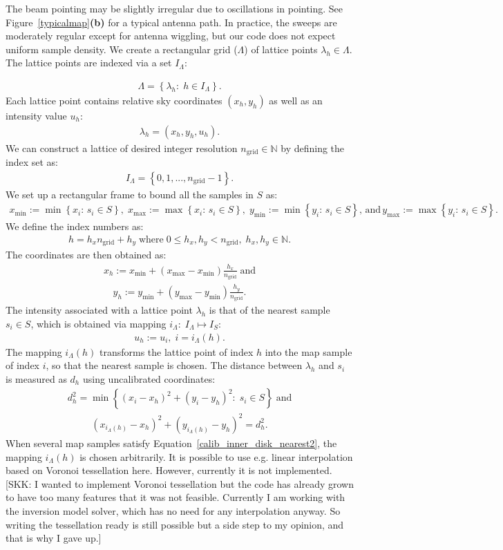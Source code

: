 \documentclass{aa}
\newcommand{\skk}[1]{\textcolor{midorange}{[SKK: #1]}} %
\newcommand{\eqnl}[2]{\begin{eqnarray}\label{#1}#2\end{eqnarray}}
\renewcommand{\min}[1]{\operatorname{min} \left\{ #1 \right\}}
\renewcommand{\max}[1]{\operatorname{max} \left\{ #1 \right\}}
\newcommand{\s}[2]{{#1}_{\mathrm{#2}}}
\begin{document}
  The beam pointing may be slightly 
  irregular due to oscillations in pointing. See Figure~\ref{typicalmap}{\bf(b)} for a typical antenna path. In 
  practice, the sweeps are moderately regular except for antenna wiggling, but our code does not expect uniform sample 
  density. We create a rectangular grid ($\Lambda$) of lattice points $\lambda_h \in \Lambda$. The lattice points are indexed via a set $I_{\Lambda}$:
  
  \eqnl{calib_inner_disk_lattice}{
  \Lambda = \left\{ \lambda_h :\; h \in I_{\Lambda} \right\} \text{.}
  }
  Each lattice point contains relative sky coordinates $\left( x_h, y_h \right)$ as well as an intensity value $u_h$:
  \eqnl{calib_inner_disk_point}{
  \lambda_h = \left( x_h, y_h, u_h \right) \text{.}
  }
  We can construct a lattice of desired integer resolution $\s{n}{grid} \in \mathds{N}$ by defining the index set as:
  \eqnl{calib_inner_disk_index}{
  I_{\Lambda} = \left\{ 0, 1, ..., \s{n}{grid}-1 \right\} \text{.}
  }
  We set up a rectangular frame to bound all the samples in $S$ as:
  \eqnl{calib_inner_disk_frame}{
  \s{x}{min} := \min{x_i:\, s_i \in S}, \; \s{x}{max} := \max{x_i:\, s_i \in S}, \; \s{y}{min} := \min{y_i:\, s_i \in S} \text{, and} \, \s{y}{max} := \max{y_i:\, s_i \in S} \text{.}
  }
  We define the index numbers as:
  \eqnl{calib_inner_disk_elem}{
  h = h_x \s{n}{grid} + h_y \; \text{where} \; 0 \le h_x,h_y < \s{n}{grid}, \; h_x,h_y \in \mathds{N} \text{.}
  }
  The coordinates are then obtained as:
  \eqnl{calib_inner_disk_lattice_x}{
  x_h := \s{x}{min} + \left( \s{x}{max} - \s{x}{min} \right) \frac{h_x}{\s{n}{grid}} \; \text{and}
  }
  \eqnl{calib_inner_disk_lattice_y}{
  y_h := \s{y}{min} + \left( \s{y}{max} - \s{y}{min} \right) \frac{h_y}{\s{n}{grid}} \text{.}
  }
  The intensity associated with a lattice point $\lambda_h$ is that of the nearest sample $s_i \in S$, which is obtained via mapping $i_{\Lambda}:\; I_{\Lambda} \mapsto I_S$:
  \eqnl{calib_inner_disk_lattice_u}{
  u_h := u_i, \; i = i_{\Lambda}(h) \text{.}
  }
  The mapping $i_{\Lambda}(h)$ transforms the lattice point of index $h$ into the map sample of index $i$, so that the nearest sample is chosen. The distance between $\lambda_h$ and $s_i$ is measured as $d_h$ using uncalibrated coordinates:
  \eqnl{calib_inner_disk_nearest1}{
  d_h^2 = \min{\left( x_i - x_h \right)^2 + \left( y_i - y_h \right)^2:\; s_i \in S} \; \text{and}
  }
  \eqnl{calib_inner_disk_nearest2}{
  \left( x_{i_{\Lambda}(h)} - x_h \right)^2 + \left( y_{i_{\Lambda}(h)} - y_h \right)^2 = d_h^2 \text{.}
  }
   When several map samples satisfy Equation~\ref{calib_inner_disk_nearest2}, the mapping $i_{\Lambda}(h)$ is chosen 
  arbitrarily. It is possible to use e.g. linear interpolation based on Voronoi tessellation here. However, currently it 
  is not implemented. \skk{I wanted to implement Voronoi tessellation but the code has already grown to have too many 
  features that it was not feasible. Currently I am working with the inversion model solver, which has no need for any 
  interpolation anyway. So writing the tessellation ready is still possible but a side step to my opinion, and that is 
  why I gave up.}
 
\end{document}
